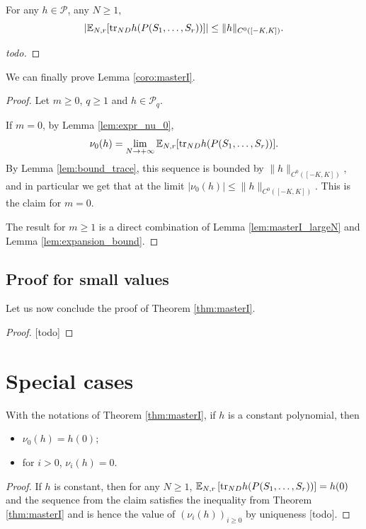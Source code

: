 \begin{lemma}
  \label{lem:bound_trace}
  For any $h \in \mathcal{P}$, any $N \geq 1$,
  \begin{equation*}
    |\expec [\trN[ND] h(P(S_1, \ldots, S_r))]| \leq \|h\|_{C^0([-K,K])}.
  \end{equation*}
\end{lemma}

\begin{proof}
  [todo]
\end{proof}

We can finally prove Lemma \ref{coro:masterI}.

\begin{proof}
  Let $m \geq 0$, $q \geq 1$ and $h \in \mathcal{P}_q$.

  If $m=0$, by Lemma \ref{lem:expr_nu_0},
  \begin{equation*}
        \nu_0(h) = \lim_{N \rightarrow +\infty} \expec [\trN[ND] h(P(S_1, \ldots, S_r))].
  \end{equation*}
  By Lemma \ref{lem:bound_trace}, this sequence is bounded by $\|h\|_{C^0([-K,K])}$,
  and in particular we get that at the limit
  $|\nu_0(h)| \leq \|h\|_{C^0([-K,K])}$. This is the claim for $m=0$.

  The result for $m \geq 1$ is a direct combination of Lemma \ref{lem:masterI_largeN} and
  Lemma \ref{lem:expansion_bound}.
\end{proof}


\subsection{Proof for small values}

Let us now conclude the proof of Theorem \ref{thm:masterI}.

\begin{proof}
  [todo]
\end{proof}

\section{Special cases}

\begin{lemma}
  \label{lem:value_nu_at_one}
  With the notations of Theorem \ref{thm:masterI},
  if $h$ is a constant polynomial, then
  \begin{itemize}
    \item $\nu_0(h)=h(0)$;
    \item for $i >0$, $\nu_i(h)=0$.
  \end{itemize}
\end{lemma}

\begin{proof}
  If $h$ is constant, then for any $N \geq 1$,
  $\expec\left[\trN[ND] h(P(S_1, \ldots, S_r))\right] = h(0)$
  and the sequence from the claim satisfies the inequality from Theorem \ref{thm:masterI} and
  is hence the value of $(\nu_i(h))_{i \geq 0}$ by uniqueness [todo].
\end{proof}
